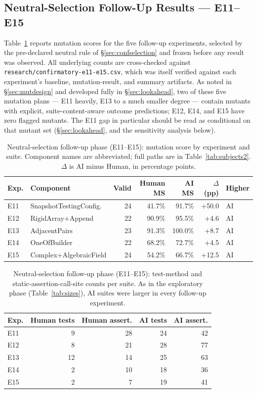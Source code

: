\documentclass[10pt,conference]{IEEEtran}
\begin{document}
\subsection{Neutral-Selection Follow-Up Results --- E11--E15}
\label{sec:confresults}
Table~\ref{tab:confresults} reports mutation scores for the five follow-up experiments, selected by the pre-declared neutral rule of \S\ref{sec:confselection} and frozen before any result was observed. All underlying counts are cross-checked against \texttt{research/confirmatory-e11-e15.csv}, which was itself verified against each experiment's baseline, mutation-result, and summary artifacts. As noted in \S\ref{sec:mutdesign} and developed fully in \S\ref{sec:lookahead}, two of these five mutation plans — E11 heavily, E13 to a much smaller degree — contain mutants with explicit, suite-content-aware outcome predictions; E12, E14, and E15 have zero flagged mutants. The E11 gap in particular should be read as conditional on that mutant set (\S\ref{sec:lookahead}, and the sensitivity analysis below).

\begin{table}[ht]
\centering
\caption{Neutral-selection follow-up phase (E11--E15): mutation score by experiment and suite. Component names are abbreviated; full paths are in Table~\ref{tab:subjects2}. $\Delta$ is AI minus Human, in percentage points.}
\label{tab:confresults}
\small
\begin{tabular}{llrrrrl}
\toprule
Exp. & Component & Valid & Human MS & AI MS & $\Delta$ (pp) & Higher \\
\midrule
E11 & SnapshotTestingConfig. & 24 & 41.7\% & 91.7\% & +50.0 & AI \\
E12 & RigidArray+Append & 22 & 90.9\% & 95.5\% & +4.6 & AI \\
E13 & AdjacentPairs & 23 & 91.3\% & 100.0\% & +8.7 & AI \\
E14 & OneOfBuilder & 22 & 68.2\% & 72.7\% & +4.5 & AI \\
E15 & Complex+AlgebraicField & 24 & 54.2\% & 66.7\% & +12.5 & AI \\
\bottomrule
\end{tabular}
\end{table}

\begin{table}[ht]
\centering
\caption{Neutral-selection follow-up phase (E11--E15): test-method and static-assertion-call-site counts per suite. As in the exploratory phase (Table~\ref{tab:sizes}), AI suites were larger in every follow-up experiment.}
\label{tab:sizes2}
\small
\begin{tabular}{lrrrr}
\toprule
Exp. & Human tests & Human assert. & AI tests & AI assert. \\
\midrule
E11 & 9 & 28 & 24 & 42 \\
E12 & 8 & 21 & 28 & 77 \\
E13 & 12 & 14 & 25 & 63 \\
E14 & 2 & 10 & 18 & 36 \\
E15 & 2 & 7 & 19 & 41 \\
\bottomrule
\end{tabular}
\end{table}
\end{document}
